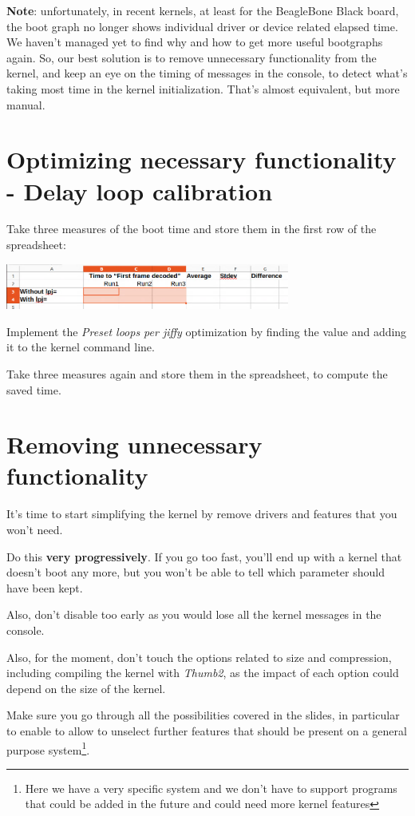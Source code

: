 {\bf Note}: unfortunately, in recent kernels, at least for the BeagleBone Black
board, the boot graph no longer shows individual driver or device
related elapsed time. We haven't managed yet to find why
and how to get more useful bootgraphs again. So, our best solution is
to remove unnecessary functionality from the kernel, and keep an eye
on the timing of messages in the console, to detect what's taking most
time in the kernel initialization. That's almost equivalent, but more
manual.

\section{Optimizing necessary functionality - Delay loop calibration}

Take three measures of the boot time and store them in the first row of
the  spreadsheet:

\includegraphics[width=0.7\textwidth]{labs/boot-time-kernel/lpj-time.png}

Implement the {\em Preset loops per jiffy} optimization by
finding the  value and adding it to the kernel command line.

Take three measures again and store them in the spreadsheet, to compute
the saved time.

\section{Removing unnecessary functionality}

It's time to start simplifying the kernel by remove drivers and features
that you won't need.

Do this {\bf very progressively}. If you go too fast, you'll end up with a
kernel that doesn't boot any more, but you won't be able to tell which
parameter should have been kept.

Also, don't disable  too early
as you would lose all the kernel messages in the console.

Also, for the moment, don't touch the options related to size and
compression, including compiling the kernel with {\em Thumb2}, as the
impact of each option could depend on the size of the kernel.

Make sure you go through all the possibilities covered in the slides, in
particular to enable  to allow to unselect further
features that should be present on a general purpose
system\footnote{Here we have a very specific system and we don't have
to support programs that could be added in the future and could need
more kernel features}.

